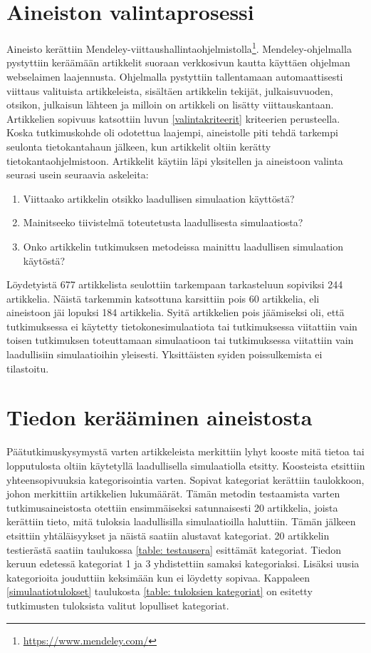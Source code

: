 \documentclass[utf8]{gradu3}
\begin{document}
\section{Aineiston valintaprosessi} \label{valintaprosessi}
Aineisto kerättiin Mendeley-viittaushallintaohjelmistolla\footnote{\url{https://www.mendeley.com/}}. Mendeley-ohjelmalla pystyttiin keräämään artikkelit suoraan verkkosivun kautta käyttäen ohjelman webselaimen laajennusta. Ohjelmalla pystyttiin tallentamaan automaattisesti viittaus valituista artikkeleista, sisältäen artikkelin tekijät, julkaisuvuoden, otsikon, julkaisun lähteen ja milloin on artikkeli on lisätty viittauskantaan. Artikkelien sopivuus katsottiin luvun \ref{valintakriteerit} kriteerien perusteella. 
Koska tutkimuskohde oli odotettua laajempi, 
aineistolle piti tehdä tarkempi seulonta tietokantahaun jälkeen, 
kun artikkelit oltiin kerätty tietokantaohjelmistoon. 
Artikkelit käytiin läpi yksitellen ja aineistoon valinta seurasi usein seuraavia askeleita:

\begin{enumerate}
    \item Viittaako artikkelin otsikko laadullisen simulaation käyttöstä?
    \item Mainitseeko tiivistelmä toteutetusta laadullisesta simulaatiosta?
    \item Onko artikkelin tutkimuksen metodeissa mainittu laadullisen simulaation käytöstä?
\end{enumerate}

Löydetyistä 677 artikkelista seulottiin tarkempaan tarkasteluun sopiviksi 244 artikkelia. 
Näistä tarkemmin katsottuna karsittiin pois 60 artikkelia, 
eli aineistoon jäi lopuksi 184 artikkelia. 
Syitä artikkelien pois jäämiseksi oli, 
että tutkimuksessa ei käytetty tietokonesimulaatiota tai 
tutkimuksessa viitattiin vain toisen tutkimuksen toteuttamaan simulaatioon tai
tutkimuksessa viitattiin vain laadullisiin simulaatioihin yleisesti.
Yksittäisten syiden poissulkemista ei tilastoitu.

\section{Tiedon kerääminen aineistosta} \label{tiedon keruu}
Päätutkimuskysymystä varten artikkeleista merkittiin lyhyt kooste mitä tietoa tai
lopputulosta oltiin käytetyllä laadullisella simulaatiolla etsitty. 
Koosteista etsittiin yhteensopivuuksia kategorisointia varten. 
Sopivat kategoriat kerättiin taulokkoon, johon merkittiin artikkelien lukumäärät.
Tämän metodin testaamista varten tutkimusaineistosta otettiin ensimmäiseksi
satunnaisesti 20 artikkelia, joista kerättiin tieto, mitä tuloksia laadullisilla
simulaatioilla haluttiin. Tämän jälkeen etsittiin yhtäläisyykset ja näistä saatiin
alustavat kategoriat. 20 artikkelin testierästä saatiin taulukossa 
\ref{table: testausera} esittämät kategoriat. Tiedon keruun edetessä kategoriat 1
ja 3 yhdistettiin samaksi kategoriaksi. Lisäksi uusia kategorioita jouduttiin
keksimään kun ei löydetty sopivaa. Kappaleen \ref{simulaatiotulokset} taulukosta
\ref{table: tuloksien kategoriat} on esitetty tutkimusten tuloksista valitut
lopulliset kategoriat.
\end{document}
